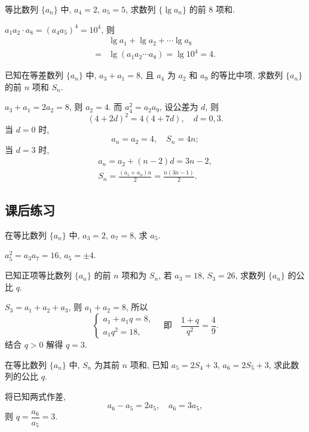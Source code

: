 \begin{exercise}
    等比数列 $\{a_n\}$ 中, $a_4=2$, $a_5=5$, 求数列 $\{\lg a_n\}$ 的前 $8$ 项和.
\end{exercise}
\beginsolution
    $a_1a_2\cdot a_8= (a_4a_5)^4= 10^4$, 则
    \[\begin{aligned}
        &\lg a_1+ \lg a_2+\cdots \lg a_8\\
        ={}& \lg (a_1 a_2\cdots a_8)
        = \lg 10^4= 4.
    \end{aligned}\]
\endsolution

\begin{exercise}
    已知在等差数列 $\{a_n\}$ 中, $a_3+a_1=8$, 且 $a_4$ 为 $a_2$ 和 $a_9$ 的等比中项, 求数列 $\{a_n\}$ 的前 $n$ 项和 $S_n$.
\end{exercise}
\beginsolution
    $a_3+a_1= 2a_2= 8$, 则 $a_2= 4$. 而 $a_4^2= a_2 a_9$, 设公差为 $d$, 则
    \[(4+2d)^2= 4(4+7d),\quad d=0,3.\]
    当 $d=0$ 时, 
    \[a_n=a_2= 4,\quad S_n= 4n;\]
    当 $d=3$ 时, 
    \[\begin{gathered}
        a_n= a_2+ (n-2)d= 3n-2,\\
        S_n= \frac{(a_1+a_n)n}2= \frac{n(3n-1)}2.
    \end{gathered}\]
\endsolution

\subsection{课后练习}
\begin{exercise}
    在等比数列 $\{a_n\}$ 中, $a_3 =2$, $a_7=8$, 求 $a_5$.
\end{exercise}
\beginsolution
    $a_5^2= a_3a_7= 16$, $a_5= \pm4$.
\endsolution

\begin{exercise}
    已知正项等比数列 $\{a_n\}$ 的前 $n$ 项和为 $S_n$, 若 $a_3=18$, $S_3=26$, 求数列 $\{a_n\}$ 的公比 $q$.
\end{exercise}
\beginsolution
    $S_3= a_1+a_2+a_3$, 则 $a_1+a_2= 8$, 所以
    \[\left\{\!\!\begin{array}{l}
        a_1+a_1q= 8,\\
        a_1 q^2= 18,
    \end{array}\right.\quad\text{即}\quad
    \frac{1+q}{q^2}= \frac49.\]
    结合 $q>0$ 解得 $q=3$.
\endsolution

\begin{exercise}
    在等比数列 $\{a_n\}$ 中, $S_n$ 为其前 $n$ 项和, 已知 $a_5 =2S_4 +3$, $a_6 =2S_5 +3$, 求此数列的公比 $q$.
\end{exercise}
\beginsolution
    将已知两式作差,
    \[a_6- a_5= 2a_5,\quad a_6= 3a_5,\]
    则 $q= \dfrac{a_6}{a_5}= 3$.
\endsolution

